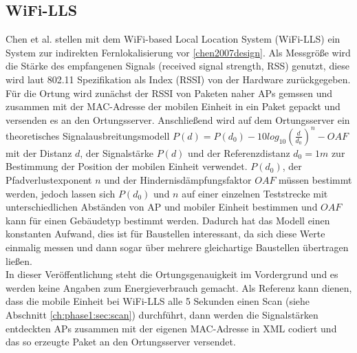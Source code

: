 \subsection{WiFi-LLS}
\label{ch:Vorherige:sec:LLS}
Chen et al. stellen mit dem WiFi-based Local Location System (WiFi-LLS) ein System zur indirekten Fernlokalisierung vor \ref{chen2007design}.
Als Messgröße wird die Stärke des empfangenen Signals (received signal strength, RSS) genutzt, diese wird laut 802.11 Spezifikation als Index (RSSI) von der Hardware zurückgegeben. \\
Für die Ortung wird zunächst der RSSI von Paketen naher APs gemssen und zusammen mit der MAC-Adresse der mobilen Einheit in ein Paket gepackt und versenden es an den Ortungsserver.
Anschließend wird auf dem Ortungsserver ein theoretisches Signalausbreitungsmodell $P(d) = P(d_0) - 10log_{10}(\frac{d}{d_0})^n - OAF$ mit der Distanz $d$, der Signalstärke $P(d)$ und der Referenzdistanz $d_0 = 1m$ zur Bestimmung der Position der mobilen Einheit verwendet. 
$P(d_0)$, der Pfadverlustexponent $n$ und der Hindernisdämpfungsfaktor $OAF$ müssen bestimmt werden, jedoch lassen sich $P(d_0)$ und $n$ auf einer einzelnen Teststrecke mit unterschiedlichen Abständen von AP und mobiler Einheit bestimmen und $OAF$ kann für einen Gebäudetyp bestimmt werden.
Dadurch hat das Modell einen konstanten Aufwand, dies ist für Baustellen interessant, da sich diese Werte einmalig messen und dann sogar über mehrere gleichartige Baustellen übertragen ließen.\\
In dieser Veröffentlichung steht die Ortungsgenauigkeit im Vordergrund und es werden keine Angaben zum Energieverbrauch gemacht. 
Als Referenz kann dienen, dass die mobile Einheit bei WiFi-LLS alle 5 Sekunden einen Scan (siehe Abschnitt \ref{ch:phase1:sec:scan}) durchführt, dann werden die Signalstärken entdeckten APs zusammen mit der eigenen MAC-Adresse in XML codiert und das so erzeugte Paket an den Ortungsserver versendet.

